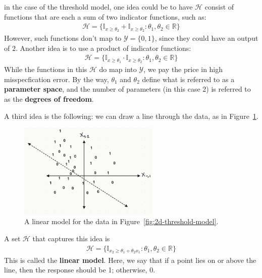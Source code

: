 \documentclass[12pt, a4paper]{article}
\theoremstyle{definition}
\begin{document}
	in the case of the threshold model, one idea could be to have $\mathcal{H}$ consist of functions
	that are each a sum of two indicator functions, such as:
	\begin{align*}
		\mathcal{H} = \{\mathbb{I}_{x\geq \theta_2} + \mathbb{I}_{x\geq \theta_2}: \theta_1,\theta_2\in\mathbb{R}\}
	\end{align*}
	However, such functions don't map to $\mathcal{Y}=\{0, 1\}$, since they could have
	an output of $2$. Another idea is to use a product of indicator functions:
	\begin{align*}
		\mathcal{H} = \{\mathbb{I}_{x\geq \theta_1}\cdot \mathbb{I}_{x\geq \theta_2}: \theta_1,\theta_2\in\mathbb{R}\}
	\end{align*}
	While the functions in this $\mathcal{H}$ do map into $\mathcal{Y}$, we pay the
	price in high misspecfication error. By the way, $\theta_1$ and $\theta_2$ define
	what is referred to as a \textbf{parameter space}, and the number of parameters
	(in this case 2) is referred to as the \textbf{degrees of freedom}.
	
	A third idea is the following: we can draw a line through the data, as in Figure~\ref{fig:linear-model}.
	\begin{figure}
		\centering
		\includegraphics[width=0.6\textwidth]{linear-model}
		\caption{A linear model for the data in Figure~\ref{fig:2d-threshold-model}.}
		\label{fig:linear-model}
	\end{figure}
	A set $\mathcal{H}$ that captures this idea is
	\begin{align*}
		\mathcal{H} = \{\mathbb{I}_{x_2\geq \theta_1+\theta_2 x_1}: \theta_1,\theta_2\in\mathbb{R}\}
	\end{align*}
	This is called the \textbf{linear model}. Here, we say that if a point lies on or above the line,
	then the response should be 1; otherwise, 0.
\end{document}
